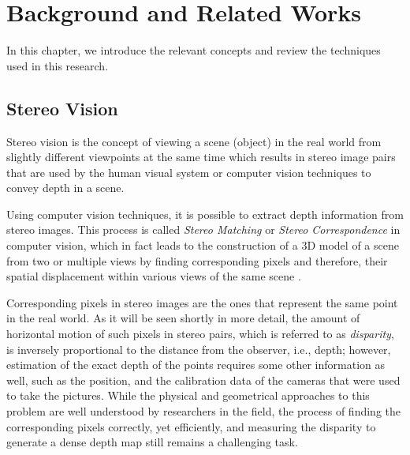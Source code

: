 \chapter{Background and Related Works}
\label{chap:Background}

In this chapter, we introduce the relevant concepts and review the techniques used in this research.

\section{Stereo Vision}

Stereo vision is the concept of viewing a scene (object) in the real world from slightly different
viewpoints at the same time which results in stereo image pairs that are used by the human visual system or computer vision techniques to convey
depth in a scene. 

Using computer vision techniques, it is possible to extract depth information from stereo
images. This process is called {\it Stereo Matching} or {\it Stereo Correspondence} in computer vision,
which in fact leads to the construction of a
3D model of a scene from two or multiple views by finding corresponding pixels and therefore, their spatial displacement within various views of the same scene \cite{sze11}.

Corresponding pixels in stereo images are the ones that represent the same point in the real
world. As it will be seen shortly in more detail, the amount of horizontal motion of such pixels
in stereo pairs, which is referred to as {\it disparity}, is inversely proportional to the
distance from the observer, i.e., depth; however,  estimation of the exact depth of the points requires some
other information as well, such as the position, and the calibration data of the cameras that were used to take the pictures.
While the physical and geometrical approaches to this problem are well understood by researchers in the field, the process of finding the corresponding pixels correctly, 
yet efficiently, and measuring the disparity to generate a dense depth map still remains a challenging task.

